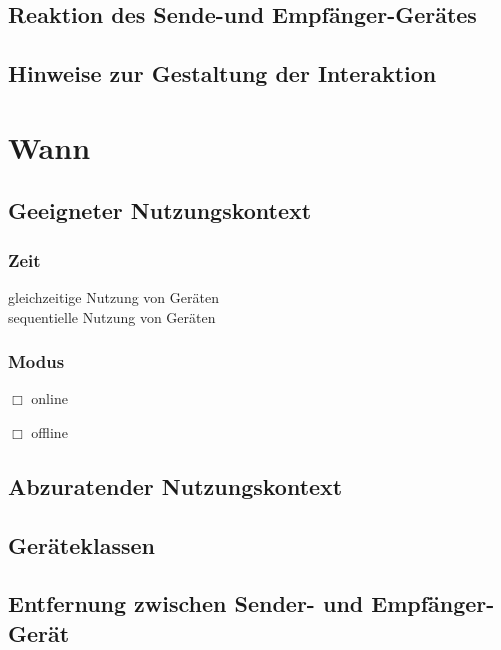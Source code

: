 \subsection*{Reaktion des Sende-und Empfänger-Gerätes}
\reaction

\subsection*{Hinweise zur Gestaltung der Interaktion}


\section*{Wann}

\subsection*{Geeigneter Nutzungskontext}

\subsubsection*{Zeit}
 gleichzeitige Nutzung von Geräten \\
 sequentielle Nutzung von Geräten 


\subsubsection*{Modus}

\if{}
{$\Box$} online
\else{$\boxtimes$} 
\fi

\if{}
{$\Box$} offline
\else{$\boxtimes$}
\fi


\subsection*{Abzuratender Nutzungskontext}

\subsection*{Geräteklassen}
\devicetabular

\subsection*{Entfernung zwischen Sender- und Empfänger-Gerät}

